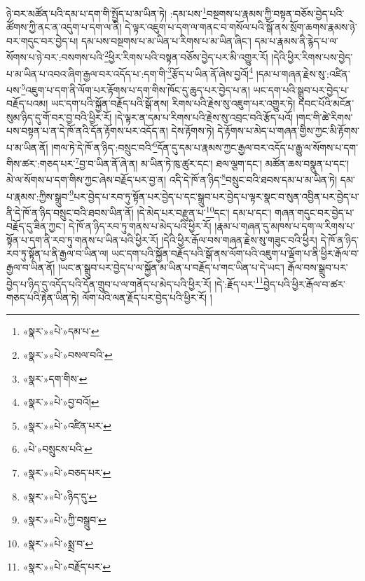 ཉེ་བར་མཚོན་པའི་དམ་པ་དག་གི་སྤྱོད་པ་མ་ཡིན་ཏེ། :དམ་པས་\footnote{«སྣར་»«པེ་»དམ་པ་}བསྔགས་པ་རྣམས་ཀྱི་བསྟན་བཅོས་བྱེད་པའི་ཚོགས་ཀྱི་ནང་ན་འདུག་པ་དག་ལ་ནི། དེ་ལྟར་འཇུག་པ་དག་ལ་གནང་བ་གསོལ་པའི་སྒོ་ནས་སྲོག་ཆགས་རྣམས་ཉེ་བར་གདུང་བར་བྱེད་པ། དམ་པས་བསྔགས་པ་མ་ཡིན་པ་རིགས་པ་མ་ཡིན་ཞིང་། དམ་པ་རྣམས་ནི་རྙེད་པ་ལ་སོགས་པ་ཉེ་བར་:བསགས་པའི་\footnote{«སྣར་»«པེ་»བསལ་བའི་}ཕྱིར་རིགས་པའི་བསྟན་བཅོས་བྱེད་པར་མི་འགྱུར་རོ། །དེའི་ཕྱིར་རིགས་པས་བྱེད་པ་མ་ཡིན་པ་འབའ་ཞིག་རྒྱལ་བར་འདོད་པ་:དག་གི་\footnote{«སྣར་»དག་གིས་}རྩོད་པ་ཡིན་ནོ་ཞེས་བྱའོ།\footnote{«སྣར་»«པེ་»བྱ་བའོ།} །དམ་པ་གཞན་རྗེས་སུ་:འཛིན་པས་\footnote{«སྣར་»«པེ་»འཛིན་པར་}འཇུག་པ་དག་ནི་ལོག་པར་རྟོགས་པ་དག་གིས་ཁོང་དུ་ཆུད་པར་བྱེད་པ་ན། ཡང་དག་པའི་སྒྲུབ་པར་བྱེད་པ་བརྗོད་པའམ། ཡང་དག་པའི་སྐྱོན་བརྗོད་པའི་སྒོ་ནས། རིགས་པའི་རྗེས་སུ་འཇུག་པར་འགྱུར་ཏེ། དབང་པོའི་མངོན་སུམ་ཉིད་དུ་གོ་བར་བྱ་བའི་ཕྱིར་རོ། །དེ་ལྟར་ན་དམ་པ་རིགས་པའི་རྗེས་སུ་འབྲང་བའི་རྩོད་པའོ། །གང་གི་ཚེ་རིགས་པས་བསྟན་པ་ན་དེ་ཁོ་ནའི་དོན་རྟོགས་པར་འདོད་ན། དེས་རྟོགས་ཏེ། དེ་རྟོགས་པ་མེད་པ་གཞན་གྱིས་ཀྱང་མི་རྟོགས་པ་མ་ཡིན་ནོ། །གལ་ཏེ་དེ་ཁོ་ན་ཉིད་:བསྲུང་བའི་\footnote{«པེ་»བསྲུངས་པའི་}དོན་དུ་དམ་པ་རྣམས་ཀྱང་རྒྱལ་བར་འདོད་པ་རྒྱུ་ལ་སོགས་པ་དག་གིས་ཚར་:གཅད་པར་\footnote{«སྣར་»«པེ་»བཅད་པར་}བྱ་བ་ཡིན་ནོ་ཞེ་ན། མ་ཡིན་ཏེ་ཁུ་ཚུར་དང་། ཐལ་ལྕག་དང་། མཚོན་ཆས་བསྣུན་པ་དང་། མེ་ལ་སོགས་པ་དག་གིས་ཀྱང་ཞེས་བརྗོད་པར་བྱ་ན། འདི་དེ་ཁོ་ན་ཉིད་\footnote{«སྣར་»«པེ་»ཉིད་དུ་}བསྲུང་བའི་ཐབས་དམ་པ་མ་ཡིན་ཏེ། དམ་པ་རྣམས་:ཀྱིས་སྒྲུབ་\footnote{«སྣར་»«པེ་»ཀྱི་བསྒྲུབ་}པར་བྱེད་པ་རབ་ཏུ་སྟོན་པར་བྱེད་པ་དང་སྒྲུབ་པར་བྱེད་པ་ལྟར་སྣང་བ་སུན་འབྱིན་པར་བྱེད་པ་ནི་དེ་ཁོ་ན་ཉིད་བསྲུང་བའི་ཐབས་ཡིན་ནོ། །དེ་མེད་པར་བརྫུན་པ་\footnote{«སྣར་»«པེ་»སྨྲ་བ་}དང་། དམ་པ་དང་། གཞན་གདུང་བར་བྱེད་པ་བརྗོད་དུ་ཟིན་ཀྱང་། དེ་ཁོ་ན་ཉིད་རབ་ཏུ་གནས་པ་མེད་པའི་ཕྱིར་རོ། །རྣམ་པ་གཞན་དུ་མཁས་པ་དག་ལ་རིགས་པ་སྟོན་པ་དག་ནི་རབ་ཏུ་གནས་པ་ཡིན་པའི་ཕྱིར་རོ། །དེའི་ཕྱིར་རྒོལ་བས་གཞན་རྗེས་སུ་གཟུང་བའི་ཕྱིར། དེ་ཁོ་ན་ཉིད་རབ་ཏུ་སྟོན་པ་ནི་རྒྱལ་བ་ཡིན་ལ། ཡང་དག་པའི་སྐྱོན་བརྗོད་པའི་སྒོ་ནས་ལོག་པའི་འཇུག་པ་ལྡོག་པ་ནི་ཕྱིར་རྒོལ་བ་རྒྱལ་བ་ཡིན་ནོ། །ཡང་ན་སྒྲུབ་པར་བྱེད་པ་ལ་སྐྱོན་མ་ཡིན་པ་བརྗོད་པ་གང་ཡིན་པ་དེ་ཡང་། རྒོལ་བས་སྒྲུབ་པར་བྱེད་པ་ཉིད་དུ་འདོད་པའི་དོན་གྲུབ་པ་ལ་གནོད་པ་མེད་པའི་ཕྱིར་རོ། །དེ་:རྗོད་པར་\footnote{«སྣར་»«པེ་»བརྗོད་པར་}བྱེད་པའི་ཕྱིར་རྒོལ་བ་ཚར་གཅད་པའི་རྟེན་ཡིན་ཏེ། ལོག་པའི་ལན་རྗོད་པར་བྱེད་པའི་ཕྱིར་རོ། །
